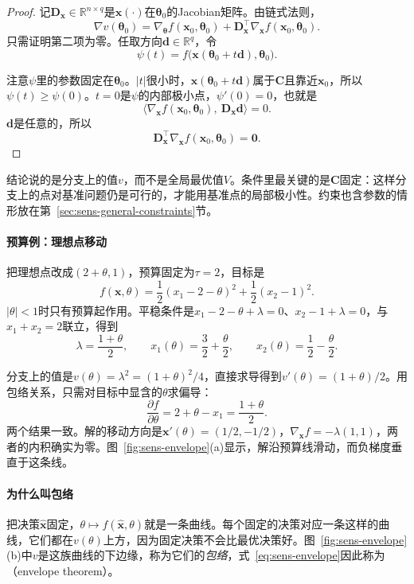 \begin{proof}
记$\bm{D}_{\bm{x}}\in\mathbb{R}^{n\times q}$是$\bm{x}(\cdot)$在$\bm{\theta}_0$的Jacobian矩阵。由链式法则，
\[
 \nabla v(\bm{\theta}_0)=\nabla_{\bm{\theta}}f(\bm{x}_0,\bm{\theta}_0)+\bm{D}_{\bm{x}}^{\top}\nabla_{\bm{x}}f(\bm{x}_0,\bm{\theta}_0).
\]
只需证明第二项为零。任取方向$\bm{d}\in\mathbb{R}^q$，令
\[
 \psi(t)=f\bigl(\bm{x}(\bm{\theta}_0+t\bm{d}),\bm{\theta}_0\bigr).
\]

注意$\psi$里的参数固定在$\bm{\theta}_0$。$\lvert t\rvert$很小时，$\bm{x}(\bm{\theta}_0+t\bm{d})$属于$\bm{C}$且靠近$\bm{x}_0$，所以$\psi(t)\geq\psi(0)$。$t=0$是$\psi$的内部极小点，$\psi'(0)=0$，也就是
\[
 \bigl\langle\nabla_{\bm{x}}f(\bm{x}_0,\bm{\theta}_0),\ \bm{D}_{\bm{x}}\bm{d}\bigr\rangle=0.
\]
$\bm{d}$是任意的，所以
\[
 \bm{D}_{\bm{x}}^{\top}\nabla_{\bm{x}}f(\bm{x}_0,\bm{\theta}_0)=\bm{0}.
\]
\end{proof}

结论说的是分支上的值$v$，而不是全局最优值$V$。条件里最关键的是$\bm{C}$固定：这样分支上的点对基准问题仍是可行的，才能用基准点的局部极小性。约束也含参数的情形放在第~\ref{sec:sens-general-constraints}节。

\paragraph{预算例：理想点移动}
把理想点改成$(2+\theta,1)$，预算固定为$\tau=2$，目标是
\[
 f(\bm{x},\theta)=\frac12(x_1-2-\theta)^2+\frac12(x_2-1)^2.
\]
$\lvert\theta\rvert<1$时只有预算起作用。平稳条件是$x_1-2-\theta+\lambda=0$、$x_2-1+\lambda=0$，与$x_1+x_2=2$联立，得到
\[
 \lambda=\frac{1+\theta}{2},\qquad
 x_1(\theta)=\frac32+\frac{\theta}{2},\qquad
 x_2(\theta)=\frac12-\frac{\theta}{2}.
\]

分支上的值是$v(\theta)=\lambda^2=(1+\theta)^2/4$，直接求导得到$v'(\theta)=(1+\theta)/2$。用包络关系，只需对目标中显含的$\theta$求偏导：
\[
 \frac{\partial f}{\partial\theta}=2+\theta-x_1=\frac{1+\theta}{2}.
\]
两个结果一致。解的移动方向是$\bm{x}'(\theta)=(1/2,-1/2)$，$\nabla_{\bm{x}}f=-\lambda(1,1)$，两者的内积确实为零。图~\ref{fig:sens-envelope}(a)显示，解沿预算线滑动，而负梯度垂直于这条线。

\paragraph{为什么叫包络}
把决策$\hat{\bm{x}}$固定，$\theta\mapsto f(\hat{\bm{x}},\theta)$就是一条曲线。每个固定的决策对应一条这样的曲线，它们都在$v(\theta)$上方，因为固定决策不会比最优决策好。图~\ref{fig:sens-envelope}(b)中$v$是这族曲线的下边缘，称为它们的\emph{包络}，式~\eqref{eq:sens-envelope}因此称为（envelope theorem）。


